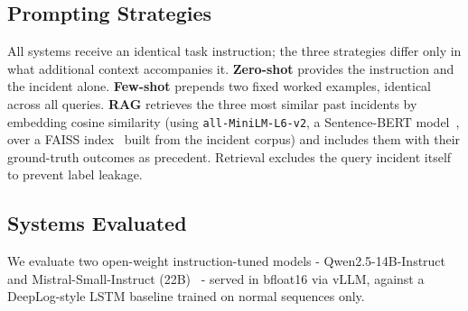 \documentclass[10pt,conference]{IEEEtran}
\begin{document}
\subsection{Prompting Strategies}
All systems receive an identical task instruction; the three strategies
differ only in what additional context accompanies it.
\textbf{Zero-shot} provides the instruction and the incident alone.
\textbf{Few-shot} prepends two fixed worked examples, identical across
all queries. \textbf{RAG} retrieves the three most similar past incidents
by embedding cosine similarity (using \texttt{all-MiniLM-L6-v2}, a
Sentence-BERT model~\cite{reimers2019sbert}, over a
FAISS index~\cite{johnson2019faiss} built from the incident corpus) and includes them with their
ground-truth outcomes as precedent. Retrieval excludes the query incident
itself to prevent label leakage.

\subsection{Systems Evaluated}
We evaluate two open-weight instruction-tuned models -
Qwen2.5-14B-Instruct~\cite{qwen2024technical} and Mistral-Small-Instruct
(22B)~\cite{jiang2023mistral} - served in
bfloat16 via vLLM, against a DeepLog-style LSTM baseline trained on
normal sequences only.
\end{document}
